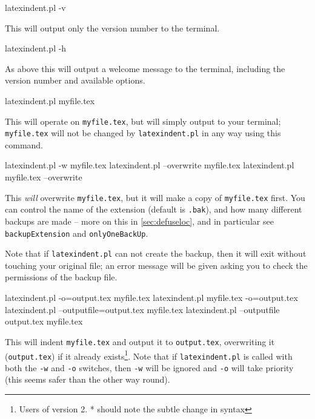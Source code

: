 	\begin{commandshell}
latexindent.pl -v
      \end{commandshell}
	This will output only the version number to the terminal.


	\begin{commandshell}
latexindent.pl -h
      \end{commandshell}

	As above this will output a welcome message to the terminal, including the version number and available options.
	\begin{commandshell}
latexindent.pl myfile.tex
      \end{commandshell}

	This will operate on \texttt{myfile.tex}, but will simply output to your terminal; \texttt{myfile.tex} will	not be changed by \texttt{latexindent.pl} in any way using this command.

	\begin{commandshell}
latexindent.pl -w myfile.tex
latexindent.pl --overwrite myfile.tex
latexindent.pl myfile.tex --overwrite 
      \end{commandshell}

	This \emph{will} overwrite \texttt{myfile.tex}, but it will make a copy of \texttt{myfile.tex} first.
	You can control the name of the extension (default is \texttt{.bak}), and how many different backups are made -- more on this in \cref{sec:defuseloc}, and in particular see \texttt{backupExtension} and \texttt{onlyOneBackUp}.

	Note that if \texttt{latexindent.pl} can not create the backup, then it will exit without touching your original file; an error message will be given asking you to check the permissions of the backup file.

	\begin{commandshell} 
latexindent.pl -o=output.tex myfile.tex
latexindent.pl myfile.tex -o=output.tex 
latexindent.pl --outputfile=output.tex myfile.tex
latexindent.pl --outputfile output.tex myfile.tex
      \end{commandshell}

	This will indent \texttt{myfile.tex} and output it to \texttt{output.tex}, overwriting it (\texttt{output.tex}) if it already exists\footnote{Users of version 2.
		* should
		note the subtle change in syntax}.
	Note that if \texttt{latexindent.pl} is called with both the \texttt{-w} and \texttt{-o} switches, then \texttt{-w} will be ignored and \texttt{-o} will take priority (this seems safer than the other way round).

